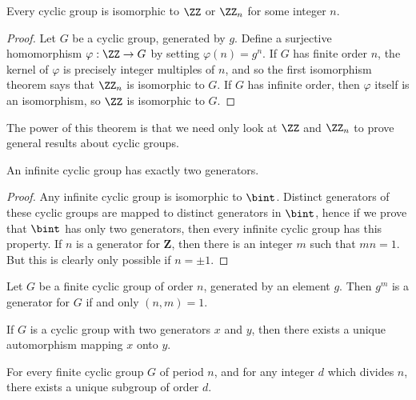 \begin{theorem}
    Every cyclic group is isomorphic to $\ZZ$ or $\ZZ_n$ for some integer $n$.
\end{theorem}
\begin{proof}
    Let $G$ be a cyclic group, generated by $g$. Define a surjective homomorphism $\varphi: \ZZ \to G$ by setting $\varphi(n) = g^n$. If $G$ has finite order $n$, the kernel of $\varphi$ is precisely integer multiples of $n$, and so the first isomorphism theorem says that $\ZZ_n$ is isomorphic to $G$. If $G$ has infinite order, then $\varphi$ itself is an isomorphism, so $\ZZ$ is isomorphic to $G$.
\end{proof}

The power of this theorem is that we need only look at $\ZZ$ and $\ZZ_n$ to prove general results about cyclic groups.

\begin{theorem}
    An infinite cyclic group has exactly two generators.
\end{theorem}
\begin{proof}
    Any infinite cyclic group is isomorphic to $\bint$. Distinct generators of these cyclic groups are mapped to distinct generators in $\bint$, hence if we prove that $\bint$ has only two generators, then every infinite cyclic group has this property. If $n$ is a generator for $\mathbf{Z}$, then there is an integer $m$ such that $mn = 1$. But this is clearly only possible if $n = \pm 1$.
\end{proof}

\begin{theorem}
    Let $G$ be a finite cyclic group of order $n$, generated by an element $g$. Then $g^m$ is a generator for $G$ if and only $(n,m) = 1$.
\end{theorem}

\begin{theorem}
    If $G$ is a cyclic group with two generators $x$ and $y$, then there exists a unique automorphism mapping $x$ onto $y$.
\end{theorem}

\begin{theorem}
    For every finite cyclic group $G$ of period $n$, and for any integer $d$ which divides $n$, there exists a unique subgroup of order $d$.
\end{theorem}

